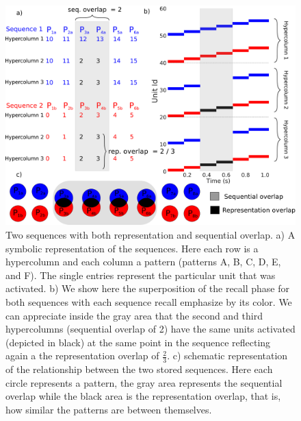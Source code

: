 \documentclass[10pt,a4paper]{article}
\begin{document}
\begin{figure}[H]
\centering
\includegraphics[scale=0.20]{rep_diagram.pdf}
\caption{Two sequences with both representation and sequential overlap. a) A symbolic representation of the sequences. Here each row is a hypercolumn and each column a pattern (patterns A, B, C, D, E, and F). The single entries represent the particular unit that was activated.  b) We show here the superposition of the recall phase for both sequences with each sequence recall emphasize by its color. We can appreciate inside the gray area that the second and third hypercolumns (sequential overlap of 2) have the same units activated (depicted in black) at the same point in the sequence reflecting again a the representation overlap of $\frac{2}{3}$. c) schematic representation of the relationship between the two stored sequences. Here each circle represents a pattern, the gray area represents the sequential overlap while the black area is the representation overlap, that is, how similar the patterns are between themselves. }
\label{fig:rep_diagram}
\end{figure}
\end{document}
